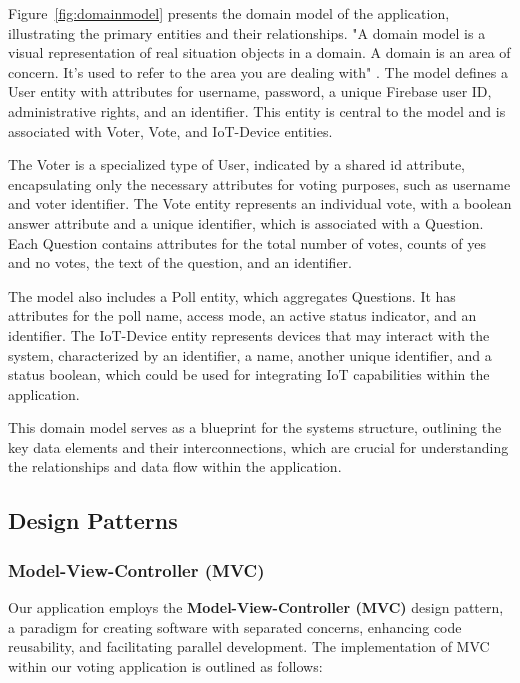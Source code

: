 Figure~\ref{fig:domainmodel} presents the domain model of the application, illustrating the primary entities and their relationships. "A domain model is a visual representation of real situation objects in a domain. A domain is an area of concern. It's used to refer to the area you are dealing with" \cite{stack2018domain}. The model defines a User entity with attributes for username, password, a unique Firebase user ID, administrative rights, and an identifier. This entity is central to the model and is associated with Voter, Vote, and IoT-Device entities.

The Voter is a specialized type of User, indicated by a shared id attribute, encapsulating only the necessary attributes for voting purposes, such as username and voter identifier. The Vote entity represents an individual vote, with a boolean answer attribute and a unique identifier, which is associated with a Question. Each Question contains attributes for the total number of votes, counts of yes and no votes, the text of the question, and an identifier.

The model also includes a Poll entity, which aggregates Questions. It has attributes for the poll name, access mode, an active status indicator, and an identifier. The IoT-Device entity represents devices that may interact with the system, characterized by an identifier, a name, another unique identifier, and a status boolean, which could be used for integrating IoT capabilities within the application.

This domain model serves as a blueprint for the systems structure, outlining the key data elements and their interconnections, which are crucial for understanding the relationships and data flow within the application.

\subsection{Design Patterns}

\subsubsection{Model-View-Controller (MVC)}

Our application employs the \textbf{Model-View-Controller (MVC)} design pattern, a paradigm for creating software with separated concerns, enhancing code reusability, and facilitating parallel development. The implementation of MVC within our voting application is outlined as follows:

